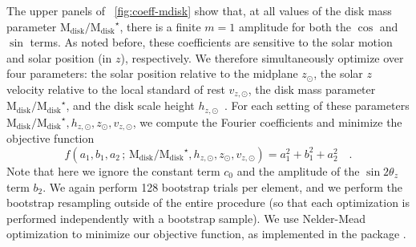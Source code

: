 \documentclass[modern]{aastex63}
\newcommand{\mdisk}{\ensuremath{\mathrm{M}_\mathrm{disk}}}
\newcommand{\mratio}{\ensuremath{\mdisk / \mdisk^\star}}
\newcommand{\hz}{\ensuremath{h_{z, \odot}}}
\newcommand{\zsun}{\ensuremath{z_\odot}}
\newcommand{\vzsun}{\ensuremath{v_{z, \odot}}}
\begin{document}
The upper panels of \figurename~\ref{fig:coeff-mdisk} show that, at all values
of the disk mass parameter \mratio, there is a finite $m=1$ amplitude for both
the $\cos$ and $\sin$ terms.
As noted before, these coefficients are sensitive to the solar motion and solar
position (in $z$), respectively.
We therefore simultaneously optimize over four parameters: the solar position
relative to the midplane \zsun, the solar $z$ velocity relative to the local
standard of rest \vzsun, the disk mass parameter \mratio, and the disk
scale height \hz\ \citep[the Miyamoto--Nagai scale height parameter, not an
exponential scale height;][]{Miyamoto:1975}.
For each setting of these parameters $\mratio, \hz, \zsun, \vzsun$, we
compute the Fourier coefficients and minimize the objective function
\begin{equation}
  f(a_1, b_1, a_2 \,;\, \mratio, \hz, \zsun, \vzsun) =
    a_1^2 + b_1^2 + a_2^2 \quad . \label{eq:objective}
\end{equation}
Note that here we ignore the constant term $c_0$ and the amplitude of the $\sin
2\theta_z$ term $b_2$.
We again perform 128 bootstrap trials per element, and we perform the bootstrap
resampling outside of the entire procedure (so that each optimization is
performed independently with a bootstrap sample).
We use Nelder-Mead optimization \citep{Gao:2012} to minimize our objective
function, as implemented in the  package \citep{scipy}.
\end{document}
